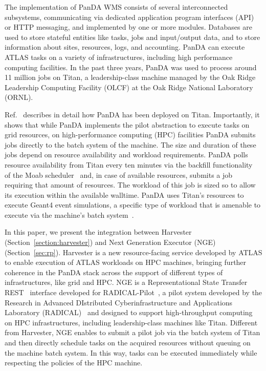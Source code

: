\documentclass{webofc}
\begin{document}
The implementation of PanDA WMS consists of several interconnected
subsystems, communicating via dedicated application program interfaces (API)
or HTTP messaging, and implemented by one or more modules. Databases are used
to store stateful entities like tasks, jobs and input/output data, and to
store information about sites, resources, logs, and accounting. PanDA can
execute ATLAS tasks on a variety of infrastructures, including high
performance computing facilities. In the past three years, PanDA was used to
process around 11 million jobs on Titan, a leadership-class machine managed
by the Oak Ridge Leadership Computing Facility (OLCF) at the Oak Ridge
National Laboratory (ORNL).

Ref.~\cite{Doleynik2017high} describes in detail how PanDA has been deployed
on Titan. Importantly, it shows that while PanDA implements the pilot
abstraction to execute tasks on grid resources, on high-performance computing
(HPC) facilities PanDA submits jobs directly to the batch system of the
machine. The size and duration of these jobs depend on resource availability
and workload requirements. PanDA polls resource availability from Titan every
ten minutes via the backfill functionality~\cite{moab-backfill} of the Moab
scheduler~\cite{guide2011moab} and, in case of available resources, submits a
job requiring that amount of resources. The workload of this job is sized so
to allow its execution within the available walltime. PanDA uses Titan’s
resources to execute Geant4 event simulations, a specific type of workload
that is amenable to execute via the machine’s batch
system~\cite{agostinelli2003geant4}.

In this paper, we present the integration between Harvester
(Section~\ref{section:harvester}) and Next Generation Executor
(NGE)~\cite{nge-git} (Section~\ref{sec:rp}). Harvester is a new
resource-facing service developed by ATLAS to enable execution of ATLAS
workloads on HPC machines, bringing further coherence in the PanDA stack
across the support of different types of infrastructures, like grid and HPC.
NGE is a Representational State Transfer REST~\cite{battle2008bridging}
interface developed for
RADICAL-Pilot~\cite{rp-docs,Merzky2018DesignAP,merzky2018using}, a pilot
system developed by the Research in Advanced DIstributed Cyberinfrastructure
and Applications Laboratory (RADICAL)~\cite{radical-web} and designed to
support high-throughput computing on HPC infrastructures, including
leadership-class machines like Titan. Different from Harvester, NGE enables
to submit a pilot job via the batch system of Titan and then directly
schedule tasks on the acquired resources without queuing on the machine batch
system. In this way, tasks can be executed immediately while respecting the
policies of the HPC machine.
\end{document}
